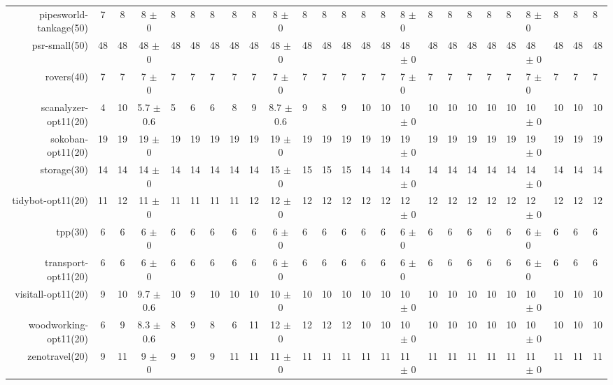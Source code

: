 \begin{center}
\begin{tabular}{|rcccHHH|cccHHHHHHHHHHHHHHH|}
pipesworld-tankage(50) & 7 & 8 & 8 $\pm$ 0 & 8 & 8 & 8 & 8 & 8 & 8 $\pm$ 0 & 8 & 8 & 8 & 8 & 8 & 8 $\pm$ 0 & 8 & 8 & 8 & 8 & 8 & 8 $\pm$ 0 & 8 & 8 & 8\\
psr-small(50) & 48 & 48 & 48 $\pm$ 0 & 48 & 48 & 48 & 48 & 48 & 48 $\pm$ 0 & 48 & 48 & 48 & 48 & 48 & 48 $\pm$ 0 & 48 & 48 & 48 & 48 & 48 & 48 $\pm$ 0 & 48 & 48 & 48\\
rovers(40) & 7 & 7 & 7 $\pm$ 0 & 7 & 7 & 7 & 7 & 7 & 7 $\pm$ 0 & 7 & 7 & 7 & 7 & 7 & 7 $\pm$ 0 & 7 & 7 & 7 & 7 & 7 & 7 $\pm$ 0 & 7 & 7 & 7\\
scanalyzer-opt11(20) & 4 & 10 & 5.7 $\pm$ 0.6 & 5 & 6 & 6 & 8 & 9 & 8.7 $\pm$ 0.6 & 9 & 8 & 9 & 10 & 10 & 10 $\pm$ 0 & 10 & 10 & 10 & 10 & 10 & 10 $\pm$ 0 & 10 & 10 & 10\\
sokoban-opt11(20) & 19 & 19 & 19 $\pm$ 0 & 19 & 19 & 19 & 19 & 19 & 19 $\pm$ 0 & 19 & 19 & 19 & 19 & 19 & 19 $\pm$ 0 & 19 & 19 & 19 & 19 & 19 & 19 $\pm$ 0 & 19 & 19 & 19\\
storage(30) & 14 & 14 & 14 $\pm$ 0 & 14 & 14 & 14 & 14 & 14 & 15 $\pm$ 0 & 15 & 15 & 15 & 14 & 14 & 14 $\pm$ 0 & 14 & 14 & 14 & 14 & 14 & 14 $\pm$ 0 & 14 & 14 & 14\\
tidybot-opt11(20) & 11 & 12 & 11 $\pm$ 0 & 11 & 11 & 11 & 11 & 12 & 12 $\pm$ 0 & 12 & 12 & 12 & 12 & 12 & 12 $\pm$ 0 & 12 & 12 & 12 & 12 & 12 & 12 $\pm$ 0 & 12 & 12 & 12\\
tpp(30) & 6 & 6 & 6 $\pm$ 0 & 6 & 6 & 6 & 6 & 6 & 6 $\pm$ 0 & 6 & 6 & 6 & 6 & 6 & 6 $\pm$ 0 & 6 & 6 & 6 & 6 & 6 & 6 $\pm$ 0 & 6 & 6 & 6\\
transport-opt11(20) & 6 & 6 & 6 $\pm$ 0 & 6 & 6 & 6 & 6 & 6 & 6 $\pm$ 0 & 6 & 6 & 6 & 6 & 6 & 6 $\pm$ 0 & 6 & 6 & 6 & 6 & 6 & 6 $\pm$ 0 & 6 & 6 & 6\\
visitall-opt11(20) & 9 & 10 & 9.7 $\pm$ 0.6 & 10 & 9 & 10 & 10 & 10 & 10 $\pm$ 0 & 10 & 10 & 10 & 10 & 10 & 10 $\pm$ 0 & 10 & 10 & 10 & 10 & 10 & 10 $\pm$ 0 & 10 & 10 & 10\\
woodworking-opt11(20) & 6 & 9 & 8.3 $\pm$ 0.6 & 8 & 9 & 8 & 6 & 11 & 12 $\pm$ 0 & 12 & 12 & 12 & 10 & 10 & 10 $\pm$ 0 & 10 & 10 & 10 & 10 & 10 & 10 $\pm$ 0 & 10 & 10 & 10\\
zenotravel(20) & 9 & 11 & 9 $\pm$ 0 & 9 & 9 & 9 & 11 & 11 & 11 $\pm$ 0 & 11 & 11 & 11 & 11 & 11 & 11 $\pm$ 0 & 11 & 11 & 11 & 11 & 11 & 11 $\pm$ 0 & 11 & 11 & 11\\
\hline
\end{tabular}
\end{center}
